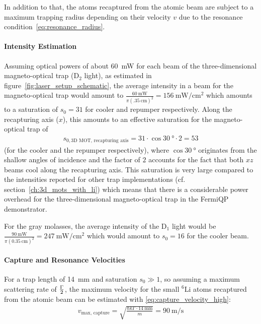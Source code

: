 In addition to that, the atoms recaptured from the atomic beam are subject to a maximum trapping radius depending on their velocity $v$ due to the resonance condition~\eqref{eq:resonance_radius}.

\paragraph{Intensity Estimation}
Assuming optical powers of about \SI{60}{\milli\watt} for each beam of the three-dimensional magneto-optical trap (D$_2$ light), as estimated in figure~\ref{fig:laser_setup_schematic}, the average intensity in a beam for the magneto-optical trap would amount to $\frac{\SI{60}{\milli\watt}}{\pi (\SI{.35}{\centi\meter})^2} = \SI{156}{\milli\watt\per\centi\meter\squared}$ which amounts to a saturation of $s_0 = 31$ for cooler and repumper respectively. Along the recapturing axis ($x$), this amounts to an effective saturation for the magneto-optical trap of
\begin{align}
    s_{0, \text{3D MOT, recapturing axis}} = 31 \cdot \cos \SI{30}{\degree} \cdot 2 = 53
\end{align}
(for the cooler and the repumper respectively), where $\cos \SI{30}{\degree}$ originates from the shallow angles of incidence and the factor of $2$ accounts for the fact that both $xz$ beams cool along the recapturing axis. This saturation is very large compared to the intensities reported for other trap implementations (cf. section~\ref{ch:3d_mots_with_li}) which means that there is a considerable power overhead for the three-dimensional magneto-optical trap in the FermiQP demonstrator.

For the gray molasses, the average intensity of the D$_1$ light would be $\frac{\SI{90}{\milli\watt}}{\pi (\SI{0.35}{\centi\meter})^2} = \SI{247}{\milli\watt\per\centi\meter\squared}$ which would amount to $s_0 = 16$ for the cooler beam.

\paragraph{Capture and Resonance Velocities}
For a trap length of \SI[]{14}{\milli\meter} and saturation $s_0 \gg 1$, so assuming a maximum scattering rate of $\Gamma \over 2$, the maximum velocity for the small $^6$Li atoms recaptured from the atomic beam can be estimated with \eqref{eq:capture_velocity_high}:
\begin{align}
    v_\text{max, capture} = \sqrt{\frac{\hbar k \Gamma \cdot \SI[]{14}{\milli\meter}}{m}} = \SI[]{90}{\meter\per\second}
\end{align}

